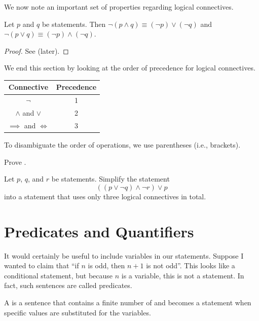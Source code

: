 We now note an important set of properties regarding logical connectives.

\begin{proposition}\label{prop:de-morgan}
    Let $p$ and $q$ be statements. Then $\lnot (p \land q) \equiv (\lnot p) \lor (\lnot q)$ and $\lnot (p \lor q) \equiv (\lnot p) \land (\lnot q)$.
\end{proposition}
\begin{proof}
    See  (later).
\end{proof}

We end this section by looking at the order of precedence for logical connectives.
\begin{table}[H]
    \centering
    \begin{tabular}{|c|c|}
        \hline
        \textbf{Connective} & \textbf{Precedence} \\ \hline
        $\lnot$ & 1 \\ \hline
        $\land$ and $\lor$ & 2 \\ \hline
        $\implies$ and $\iff$ & 3 \\ \hline
    \end{tabular}
\end{table}
To disambiguate the order of operations, we use parentheses (i.e., brackets).

\begin{exercise}\label{exercise:de-morgan}
    Prove .
\end{exercise}

\begin{exercise}
    Let $p$, $q$, and $r$ be statements. Simplify the statement
    \[
        ((p \lor \lnot q) \land \lnot r) \lor p
    \]
    into a statement that uses only three logical connectives in total.
\end{exercise}

\section{Predicates and Quantifiers}
It would certainly be useful to include variables in our statements. Suppose I wanted to claim that ``if $n$ is odd, then $n + 1$ is not odd''. This looks like a conditional statement, but because $n$ is a variable, this is not a statement. In fact, such sentences are called predicates.

\begin{definition}[Predicates]
    A  is a sentence that contains a finite number of  and becomes a statement when specific values are substituted for the variables.
\end{definition}

